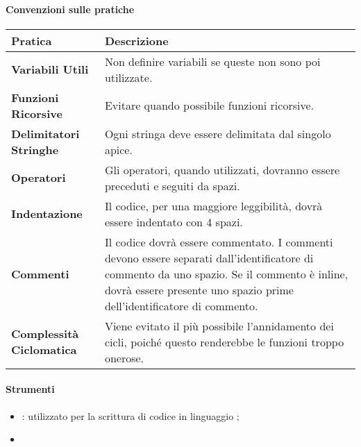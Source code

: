 		\paragraph{Convenzioni sulle pratiche} \hfill \break
    \newline
		\begin{tabular}{ |m{15em}|m{25em}| }
			\hline
		  \textbf{Pratica}			& \textbf{Descrizione}\\
			\hline
			\textbf{Variabili Utili}		& Non definire variabili se queste non sono poi utilizzate.\\
			\hline
			\textbf{Funzioni Ricorsive}		& Evitare quando possibile funzioni ricorsive.\\
			\hline
			\textbf{Delimitatori Stringhe}	& Ogni stringa deve essere delimitata dal singolo apice.\\
			\hline
			\textbf{Operatori}			& Gli operatori, quando utilizzati, dovranno essere preceduti e seguiti da spazi.\\
			\hline
			\textbf{Indentazione}			& Il codice, per una maggiore leggibilità, dovrà essere indentato con 4 spazi.\\ %
			\hline
			\textbf{Commenti}			& Il codice dovrà essere commentato. I commenti devono essere separati dall'identificatore di commento da uno spazio. Se il commento è inline, dovrà essere presente uno spazio prime dell'identificatore di commento.\\
			\hline
			\textbf{Complessità Ciclomatica}& Viene evitato il più possibile l'annidamento dei cicli, poiché questo renderebbe le funzioni troppo onerose.\\
			\hline
    \end{tabular}
		
		\paragraph{Strumenti} \hfill \break
		\begin{itemize}
      \item \textbf{}: utilizzato per la scrittura di codice in linguaggio ;
      \item 
    \end{itemize}

